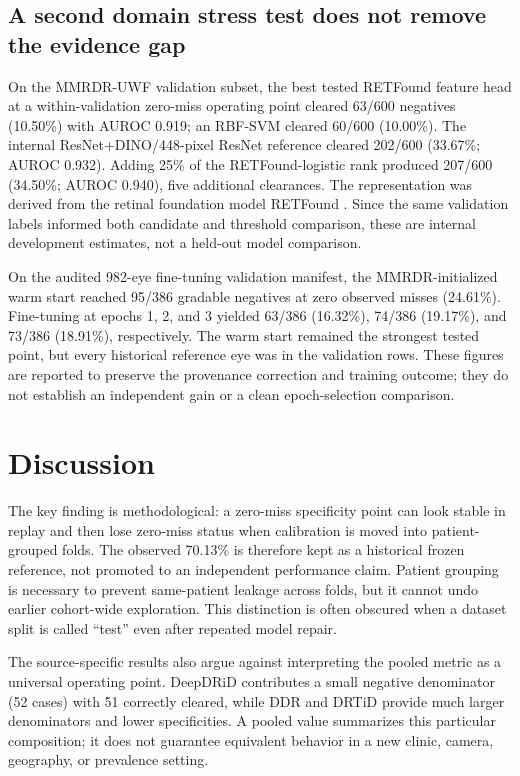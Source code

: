 \documentclass[11pt]{article}
\begin{document}
\subsection{A second domain stress test does not remove the evidence gap}
On the MMRDR-UWF validation subset, the best tested RETFound feature head at a within-validation zero-miss operating point cleared 63/600 negatives (10.50\%) with AUROC 0.919; an RBF-SVM cleared 60/600 (10.00\%). The internal ResNet+DINO/448-pixel ResNet reference cleared 202/600 (33.67\%; AUROC 0.932). Adding 25\% of the RETFound-logistic rank produced 207/600 (34.50\%; AUROC 0.940), five additional clearances. The representation was derived from the retinal foundation model RETFound \cite{retfound}. Since the same validation labels informed both candidate and threshold comparison, these are internal development estimates, not a held-out model comparison.

On the audited 982-eye fine-tuning validation manifest, the MMRDR-initialized warm start reached 95/386 gradable negatives at zero observed misses (24.61\%). Fine-tuning at epochs 1, 2, and 3 yielded 63/386 (16.32\%), 74/386 (19.17\%), and 73/386 (18.91\%), respectively. The warm start remained the strongest tested point, but every historical reference eye was in the validation rows. These figures are reported to preserve the provenance correction and training outcome; they do not establish an independent gain or a clean epoch-selection comparison.

\section{Discussion}
The key finding is methodological: a zero-miss specificity point can look stable in replay and then lose zero-miss status when calibration is moved into patient-grouped folds. The observed 70.13\% is therefore kept as a historical frozen reference, not promoted to an independent performance claim. Patient grouping is necessary to prevent same-patient leakage across folds, but it cannot undo earlier cohort-wide exploration. This distinction is often obscured when a dataset split is called ``test'' even after repeated model repair.

The source-specific results also argue against interpreting the pooled metric as a universal operating point. DeepDRiD contributes a small negative denominator (52 cases) with 51 correctly cleared, while DDR and DRTiD provide much larger denominators and lower specificities. A pooled value summarizes this particular composition; it does not guarantee equivalent behavior in a new clinic, camera, geography, or prevalence setting.
\end{document}
